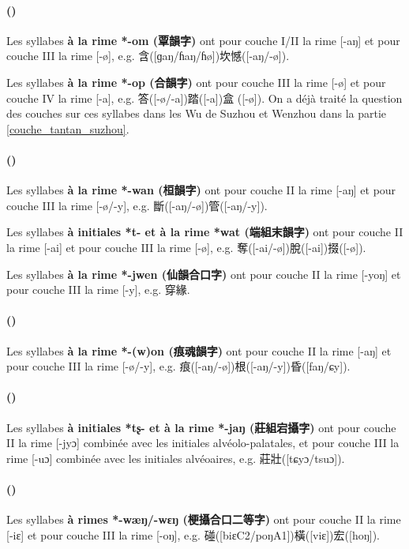 \documentclass{scrbook}
\newcounter{c}[subsubsection]
\newcommand{\stpc}[1]{\stepcounter{#1}}
\newcommand{\termyyx}[1]{\textbf{#1}}
\begin{document}
\begin{sloppypar}
\stpc{c}\paragraph{()}
Les syllabes \termyyx{à la rime *-om (覃韻字)} ont pour couche I/II la rime [-aŋ] et pour couche III la rime [-ø], e.g. 含([ɡaŋ/ɦaŋ/ɦø])坎憾([-aŋ/-ø]).

Les syllabes \termyyx{à la rime *-op (合韻字)} ont pour couche III la rime [-ø] et pour couche IV la rime [-a], e.g. 答([-ø/-a])踏([-a])盒 ([-ø]). On a déjà traité la question des couches sur ces syllabes dans les Wu de Suzhou et Wenzhou dans la partie \ref{couche_tantan_suzhou}.

\stpc{c}\paragraph{()}
Les syllabes \termyyx{à la rime *-wan (桓韻字)} ont pour couche II la rime [-aŋ] et pour couche III la rime [-ø/-y], e.g. 斷([-aŋ/-ø])管([-aŋ/-y]).

Les syllabes \termyyx{à initiales *t- et à la rime *wat (端組末韻字)} ont pour couche II la rime [-ai] et pour couche III la rime [-ø], e.g. 奪([-ai/-ø])脫([-ai])掇([-ø]).

Les syllabes \termyyx{à la rime *-jwen (仙韻合口字)} ont pour couche II la rime [-yoŋ] et pour couche III la rime [-y], e.g. 穿緣.

\stpc{c}\paragraph{()}
Les syllabes \termyyx{à la rime *-(w)on (痕魂韻字)} ont pour couche II la rime [-aŋ] et pour couche III la rime [-ø/-y], e.g. 痕([-aŋ/-ø])根([-aŋ/-y])昏([faŋ/ɕy]).

\stpc{c}\paragraph{()}
Les syllabes \termyyx{à initiales *tʂ- et à la rime *-jaŋ (莊組宕攝字)} ont pour couche II la rime [-jyɔ] combinée avec les initiales alvéolo-palatales, et pour couche III la rime [-uɔ] combinée avec les initiales alvéoaires, e.g. 莊壯([tɕyɔ/tsuɔ]).

\stpc{c}\paragraph{()}
Les syllabes \termyyx{à rimes *-wæŋ/-wɛŋ (梗攝合口二等字)} ont pour couche II la rime [-iɛ] et pour couche III la rime [-oŋ], e.g. 碰([biɛC2/poŋA1])橫([viɛ])宏([hoŋ]).


\end{sloppypar}
\end{document}
